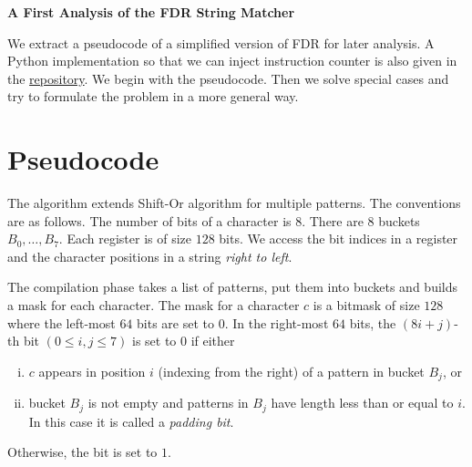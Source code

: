 \begin{center}
  \vspace{1em}
  \textbf{\LARGE A First Analysis of the FDR String Matcher}\\
  \vspace{1em}
\end{center}

We extract a pseudocode of a simplified version of FDR for later analysis. A Python implementation so that we can inject instruction counter is also given in the \href{https://github.com/mintcd/string-matchers/tree/main/src/py_fdr}{repository}. We begin with the pseudocode. Then we solve special cases and try to formulate the problem in a more general way.

\section{Pseudocode}

The algorithm extends Shift-Or algorithm for multiple patterns. The conventions are as follows. The number of bits of a character is $8$. There are $8$ buckets $B_0, \ldots, B_7$. Each register is of size $128$ bits. We access the bit indices in a register and the character positions in a string \textit{right to left}.

The compilation phase takes a list of patterns, put them into buckets and builds a mask for each character. The mask for a character $c$ is a bitmask of size $128$ where the left-most $64$ bits are set to $0$. In the right-most $64$ bits, the $(8i+j)$-th bit $(0\le i,j\le 7)$ is set to $0$ if either

\begin{enumerate}[(i)]
  \item $c$ appears in position $i$ (indexing from the right) of a pattern in bucket $B_j$, or
  \item bucket $B_j$ is not empty and patterns in $B_j$ have length less than or equal to $i$. In this case it is called a \textit{padding bit}.
\end{enumerate}

Otherwise, the bit is set to $1$.

